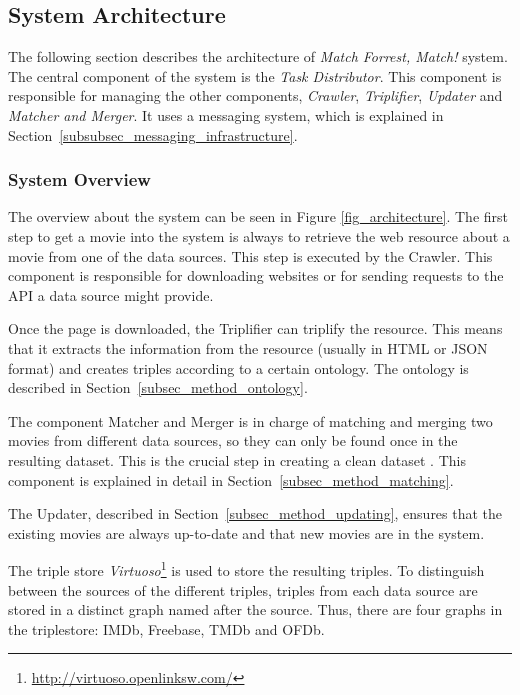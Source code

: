 \subsection{System Architecture}
\label{subsec_method_architecture}

The following section describes the architecture of \emph{Match Forrest, Match!} system.
The central component of the system is the \textit{Task Distributor}.
This component is responsible for managing the other components, \textit{Crawler}, \textit{Triplifier}, \textit{Updater} and \textit{Matcher and Merger}.
It uses a messaging system, which is explained in Section~\ref{subsubsec_messaging_infrastructure}.

\subsubsection{System Overview}
\label{subsubsec_workflow}

The overview about the system can be seen in Figure \ref{fig_architecture}.
The first step to get a movie into the system is always to retrieve the web resource about a movie from one of the data sources.
This step is executed by the Crawler.
This component is responsible for downloading websites or for sending requests to the API a data source might provide.

Once the page is downloaded, the Triplifier can triplify the resource.
This means that it extracts the information from the resource (usually in HTML or JSON format) and creates triples according to a certain ontology.
The ontology is described in Section~\ref{subsec_method_ontology}.

The component Matcher and Merger is in charge of matching and merging two movies from different data sources, so they can only be found once in the resulting dataset.
This is the crucial step in creating a clean dataset
.
This component is explained in detail in Section~\ref{subsec_method_matching}.

The Updater, described in Section~\ref{subsec_method_updating}, ensures that the existing movies are always up-to-date and that new movies are in the system.

The triple store \emph{Virtuoso}\footnote{\url{http://virtuoso.openlinksw.com/}} is used to store the resulting triples.
To distinguish between the sources of the different triples, triples from each data source are stored in a distinct graph named after the source.
Thus, there are four graphs in the triplestore: IMDb, Freebase, TMDb and OFDb.

